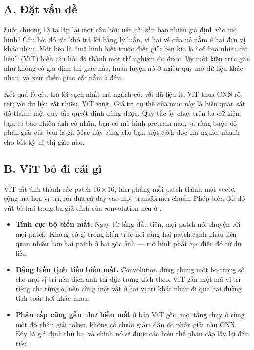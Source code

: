 \documentclass[../../../deep_learning.tex]{subfiles}
\begin{document}
\subsection{A. Đặt vấn đề}
Suốt chương 13 ta lặp lại một câu hỏi: nên cài sẵn bao nhiêu giả định vào mô hình? Câu hỏi đó rất khó trả lời bằng lý luận, vì hai vế của nó nằm ở hai đơn vị khác nhau. Một bên là ``mô hình biết trước điều gì''; bên kia là ``có bao nhiêu dữ liệu''.  (ViT) \cite{dosovitskiy2021vit} biến câu hỏi đó thành một thí nghiệm đo được: lấy một kiến trúc gần như không có giả định thị giác nào, huấn luyện nó ở nhiều quy mô dữ liệu khác nhau, và xem điểm giao cắt nằm ở đâu.

Kết quả là câu trả lời sạch nhất mà ngành có: với dữ liệu ít, ViT thua CNN rõ rệt; với dữ liệu rất nhiều, ViT vượt. Giá trị cụ thể của mục này là biến quan sát đó thành một quy tắc quyết định dùng được. Quy tắc ấy chạy trên ba dữ kiện: bạn có bao nhiêu ảnh có nhãn, bạn có mô hình pretrain nào, và ràng buộc độ phân giải của bạn là gì. Mục này cũng cho bạn một cách đọc mã nguồn nhanh cho bất kỳ hệ thị giác nào.

\subsection{B. ViT bỏ đi cái gì}
ViT cắt ảnh thành các patch \(16\times16\), làm phẳng mỗi patch thành một vectơ, cộng mã hoá vị trí, rồi đưa cả dãy vào một transformer chuẩn. Phép biến đổi đó vứt bỏ hai trong ba giả định của convolution nêu ở .

\begin{itemize}
\item \textbf{Tính cục bộ biến mất.} Ngay từ tầng đầu tiên, mọi patch nói chuyện với mọi patch. Không có gì trong kiến trúc nói rằng hai patch cạnh nhau liên quan nhiều hơn hai patch ở hai góc ảnh --- mô hình phải \emph{học} điều đó từ dữ liệu.
\item \textbf{Đẳng biến tịnh tiến biến mất.} Convolution dùng chung một bộ trọng số cho mọi vị trí nên dịch ảnh thì đặc trưng dịch theo. ViT gắn một mã vị trí riêng cho từng ô, nên cùng một vật ở hai vị trí khác nhau đi qua hai đường tính toán hơi khác nhau.
\item \textbf{Phân cấp cũng gần như biến mất} ở bản ViT gốc: mọi tầng chạy ở cùng một độ phân giải token, không có chuỗi giảm dần độ phân giải như CNN. Đây là giả định thứ ba, và chính nó sẽ được các biến thể phân cấp lấy lại đầu tiên.
\end{itemize}
\end{document}
